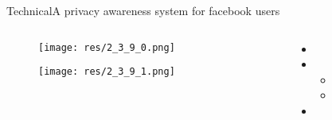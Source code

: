 \begin{frame}{Technical}{A privacy awareness system for facebook users \cite{helou_privacy_2012}}

	\begin{columns}
		\begin{column}{0.8\textwidth}
			\begin{center}
			
				\begin{figure}
					\texttt{[image: res/2\_3\_9\_0.png]}
					\caption{\label{fig:2_3_9_0}}
					
					\texttt{[image: res/2\_3\_9\_1.png]}
					\caption{\label{fig:2_3_9_1}}
				\end{figure}
				
			\end{center}
		\end{column}
		
		\begin{column}{0.2\textwidth}
		
			\begin{itemize}
				\item 
				
				\item 
					\begin{itemize}
						\item 
						\item 
					\end{itemize}
				
				\item 
			\end{itemize}
			
		\end{column}
	\end{columns}
	

\end{frame}

